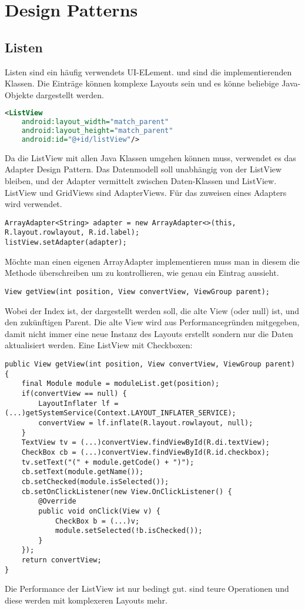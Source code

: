 \section{Design Patterns}
\subsection{Listen}
Listen sind ein häufig verwendets UI-ELement.  und  sind die implementierenden Klassen. Die Einträge können komplexe Layouts sein und es könne beliebige Java-Objekte dargestellt werden.
\begin{lstlisting}[language=xml]
<ListView
    android:layout_width="match_parent"
    android:layout_height="match_parent"
    android:id="@+id/listView"/>
\end{lstlisting}
Da die ListView mit allen Java Klassen umgehen können muss, verwendet es das Adapter Design Pattern. Das Datenmodell soll unabhängig von der ListView bleiben, und der Adapter vermittelt zwischen Daten-Klassen und ListView.\\
ListView und GridViews sind AdapterViews. Für das zuweisen eines Adapters wird  verwendet.
\begin{lstlisting}
ArrayAdapter<String> adapter = new ArrayAdapter<>(this, R.layout.rowlayout, R.id.label);
listView.setAdapter(adapter);
\end{lstlisting}
Möchte man einen eigenen ArrayAdapter implementieren muss man in diesem die  Methode überschreiben um zu kontrollieren, wie genau ein Eintrag aussieht.
\begin{lstlisting}
View getView(int position, View convertView, ViewGroup parent);
\end{lstlisting}
Wobei  der Index ist, der dargestellt werden soll,  die alte View (oder null) ist, und  den zukünftigen Parent. Die alte View wird aus Performancegründen mitgegeben, damit nicht immer eine neue Instanz des Layouts erstellt sondern nur die Daten aktualisiert werden. Eine ListView mit Checkboxen:
\begin{lstlisting}
public View getView(int position, View convertView, ViewGroup parent) {
    final Module module = moduleList.get(position);
    if(convertView == null) {
        LayoutInflater lf = (...)getSystemService(Context.LAYOUT_INFLATER_SERVICE);
        convertView = lf.inflate(R.layout.rowlayout, null);
    }
    TextView tv = (...)convertView.findViewById(R.di.textView);
    CheckBox cb = (...)convertView.findViewById(R.id.checkbox);
    tv.setText("(" + module.getCode() + ")");
    cb.setText(module.getName());
    cb.setChecked(module.isSelected());
    cb.setOnClickListener(new View.OnClickListener() {
        @Override
        public void onClick(View v) {
            CheckBox b = (...)v;
            module.setSelected(!b.isChecked());
        }
    });
    return convertView;
}
\end{lstlisting}
Die Performance der ListView ist nur bedingt gut.  sind teure Operationen und diese werden mit komplexeren Layouts mehr. 
